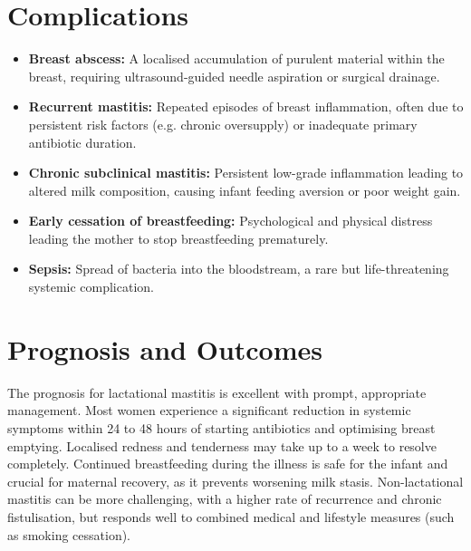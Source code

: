 \section*{Complications}
\begin{itemize}
    \item \textbf{Breast abscess:} A localised accumulation of purulent material within the breast, requiring ultrasound-guided needle aspiration or surgical drainage.
    \item \textbf{Recurrent mastitis:} Repeated episodes of breast inflammation, often due to persistent risk factors (e.g. chronic oversupply) or inadequate primary antibiotic duration.
    \item \textbf{Chronic subclinical mastitis:} Persistent low-grade inflammation leading to altered milk composition, causing infant feeding aversion or poor weight gain.
    \item \textbf{Early cessation of breastfeeding:} Psychological and physical distress leading the mother to stop breastfeeding prematurely.
    \item \textbf{Sepsis:} Spread of bacteria into the bloodstream, a rare but life-threatening systemic complication.
\end{itemize}

\section*{Prognosis and Outcomes}
The prognosis for lactational mastitis is excellent with prompt, appropriate management. Most women experience a significant reduction in systemic symptoms within 24 to 48 hours of starting antibiotics and optimising breast emptying. Localised redness and tenderness may take up to a week to resolve completely. Continued breastfeeding during the illness is safe for the infant and crucial for maternal recovery, as it prevents worsening milk stasis. Non-lactational mastitis can be more challenging, with a higher rate of recurrence and chronic fistulisation, but responds well to combined medical and lifestyle measures (such as smoking cessation).

